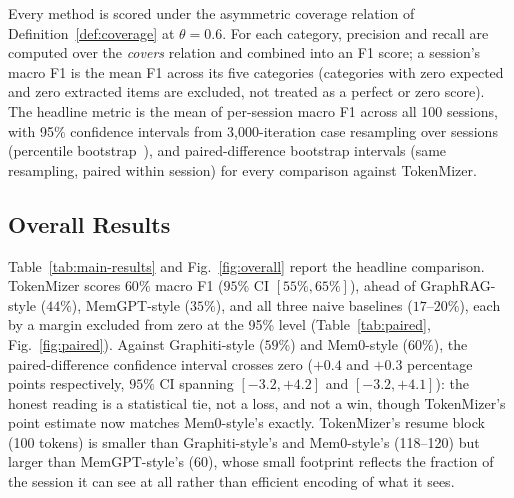 \documentclass[journal]{IEEEtran}
\begin{document}
Every method is scored under the asymmetric coverage relation
of Definition~\ref{def:coverage} at $\theta = 0.6$. For each
category, precision and recall are computed over the
\emph{covers} relation and combined into an F1 score; a
session's macro F1 is the mean F1 across its five categories
(categories with zero expected and zero extracted items are
excluded, not treated as a perfect or zero score).
The headline metric is the mean of per-session macro F1 across
all 100 sessions, with 95\% confidence intervals from
3{,}000-iteration case resampling over sessions (percentile
bootstrap~\cite{efron}), and paired-difference bootstrap intervals
(same resampling, paired within session) for every comparison
against TokenMizer.

\subsection{Overall Results}

Table~\ref{tab:main-results} and Fig.~\ref{fig:overall} report
the headline comparison.
TokenMizer scores $60\%$ macro F1
($95\%$ CI $[55\%, 65\%]$), ahead of GraphRAG-style ($44\%$),
MemGPT-style ($35\%$), and all three naive baselines
($17$--$20\%$), each by a margin excluded from zero at the
95\% level (Table~\ref{tab:paired}, Fig.~\ref{fig:paired}).
Against Graphiti-style ($59\%$) and Mem0-style ($60\%$), the
paired-difference confidence interval crosses zero
($+0.4$ and $+0.3$ percentage points respectively, $95\%$ CI
spanning $[-3.2, +4.2]$ and $[-3.2, +4.1]$): the honest
reading is a statistical tie, not a loss, and not a win, though
TokenMizer's point estimate now matches Mem0-style's exactly.
TokenMizer's resume block (100 tokens) is smaller than
Graphiti-style's and Mem0-style's (118--120) but larger than
MemGPT-style's (60), whose small footprint reflects the
fraction of the session it can see at all rather than
efficient encoding of what it sees.
\end{document}
